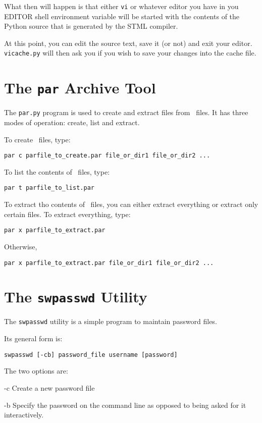 \documentclass[titlepage]{manual}
\begin{document}
What then will happen is that either \texttt{vi} or whatever editor you
have in you EDITOR shell environment variable will be started with the
contents of the Python source that is generated by the STML compiler.

At this point, you can edit the source text, save it (or not) and exit your
editor.  \texttt{vicache.py} will then ask you if you wish to save your
changes into the cache file.


\section{The \texttt{par} Archive Tool}
\label{pardotpy}
The \texttt{par.py} program is used to create and extract files from
\PAR\ files.  It has three modes of operation: create, list and
extract.

To create \PAR\ files, type:
\begin{verbatim}
par c parfile_to_create.par file_or_dir1 file_or_dir2 ...
\end{verbatim}

To list the contents of \PAR\ files, type:
\begin{verbatim}
par t parfile_to_list.par
\end{verbatim}

To extract tho contents of \PAR\ files, you can either extract
everything or extract only certain files.  To extract everything,
type:
\begin{verbatim}
par x parfile_to_extract.par
\end{verbatim}

Otherwise,
\begin{verbatim}
par x parfile_to_extract.par file_or_dir1 file_or_dir2 ...
\end{verbatim}


\section{The \texttt{swpasswd} Utility}
\label{swpasswd}
The \texttt{swpasswd} utility is a simple program to maintain
password files.  

Its general form is:
\begin{verbatim}
swpasswd [-cb] password_file username [password]
\end{verbatim}

The two options are:
\begin{argdesc}
\item[-c] Create a new password file
\item[-b] Specify the password on the command line as opposed to being
asked for it interactively.
\end{argdesc}
\end{document}
